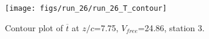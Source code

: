 \begin{figure}[H]
\centering
\texttt{[image: figs/run\_26/run\_26\_T\_contour]}
\caption{Contour plot of $\overline{t}$ at $z/c$=7.75, $V_{free}$=24.86, station 3.}
\label{fig:run_26_T_contour}
\end{figure}


